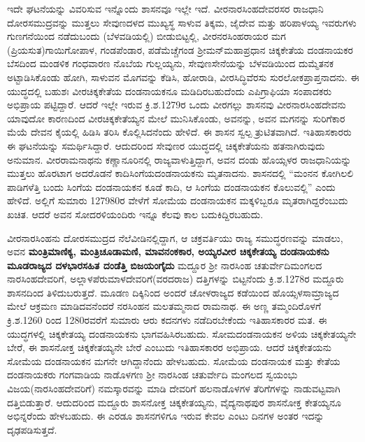ಇದೇ ಘಟನೆಯನ್ನು ವಿವರಿಸುವ ಇನ್ನೊಂದು ಶಾಸನವೂ ಇಲ್ಲೇ ಇದೆ. ವೀರನಾರಸಿಂಹದೇವರಸರ ರಾಜಧಾನಿ ದೋರಸಮುದ್ರವನ್ನು ಮುತ್ತಲು ಸೇವುಣದಳದ ಮುಖ್ಯಸ್ಥ ಸಾಳುವ ತಿಕ್ಕಮ, ಜೈದೇವ ಮತ್ತು ಹರಿಪಾಳಯ್ಯ ಇವರುಗಳು ಗುಣಗನೆಯಿಂದ ನಡೆದುಬಂದು (ಬೆಳವಡಿಯಲ್ಲಿ) ಬೀಡುಬಿಟ್ಟಲ್ಲಿ, ವೀರನರಸಿಂಹರಾಯರ ಮಗ (ಪ್ರಿಯಸುತ)\break ಗಾಯಿಗೋಪಾಳ, ಗಂಡಪೆಂಡಾರ, ಪಡೆಮೆಚ್ಚೆಗಂಡ ಶ‍್ರೀಮನ್​ಮಹಾಪ್ರಧಾನ ಚಿಕ್ಕಕೇತೆಯ ದಂಡನಾಯಕರ ಬೆಸದಿಂದ ಮಂಡಳಿಕ ಗಂಧವಾರಣ ನೊಬೆಯ ಗುಲ್ಲಯ್ಯನು, ಸೇವುಣಸೇನೆಯನ್ನು ಬೆಳವಡಿಯಿಂದ ದುಮ್ಮೆತನಕ ಅಟ್ಟಾಡಿಸಿಕೊಂಡು ಹೋಗಿ, ಸಾಳುವನ ಮೊಗವನ್ನು ಕೆಡಿಸಿ, ಹೋರಾಡಿ, ವೀರಸಿದ್ಧಿವೆರಸು ಸುರಲೋಕಪ್ರಾಪ್ತನಾದನು. ಈ ಯುದ್ಧದಲ್ಲಿ ಬಹುಶಃ ವೀರಚಿಕ್ಕಕೇತೆಯ ದಂಡನಾಯಕನೂ ಮಡಿದಿರಬಹುದೆಂದು ಎಪಿಗ್ರಾಫಿಯಾ ಸಂಪಾದಕರು ಅಭಿಪ್ರಾಯ ಪಟ್ಟಿದ್ದಾರೆ. ಆದರೆ ಇಲ್ಲೇ ಇರುವ ಕ್ರಿ.ಶ.1279ರ ಒಂದು ವೀರಗಲ್ಲು ಶಾಸನವು ವೀರನಾರಸಿಂಹದೇವನು ಯಾವುದೋ ಕಾರಣದಿಂದ ವೀರಚಿಕ್ಕಕೇತೆಯ್ಯನ ಮೇಲೆ ಮುನಿಸಿಕೊಂಡು, ಅವನನ್ನು, ಅವನ ಮಗನನ್ನು ಸುರಿಗೆಕಾರ ಮೆಯೆ ದೇವನ ಕೈಯಲ್ಲಿ ಹಿಡಿಸಿ ತರಿಸಿ ಕೊಲ್ಲಿಸಿದನೆಂದು ಹೇಳಿದೆ. ಈ ಶಾಸನ ಸ್ವಲ್ಪ ತ್ರುಟಿತವಾಗಿದೆ. ಇತಿಹಾಸಕಾರರು ಈ ಘಟನೆಯನ್ನು ಸಮರ್ಥಿಸಿದ್ದಾರೆ. ಆದುದರಿಂದ ಸೇವುಣರ ಯುದ್ಧದಲ್ಲಿ ಚಿಕ್ಕಕೇತೆಯನು ಹತನಾಗಿರುವುದು ಅನುಮಾನ. ವೀರರಾಮನಾಥನು ಕಣ್ಣಾನೂರಿನಲ್ಲಿ ರಾಜ್ಯವಾಳುತ್ತಿದ್ದಾಗ, ಅವನ ದಂಡು ಹೊಯ್ಸಳರ ರಾಜಧಾನಿಯನ್ನು ಮುತ್ತಲು ಹೊರಟಾಗ ಅದರೊಡನೆ ಕಾದಿ\break ಸಿಂಗೆಯದಂಡನಾಯಕನು ಮೃತನಾದನು. ಶಾಸನದಲ್ಲಿ “ಮಂನನ ಕೋಗಿಲಲಿ ಪಾಡಿಗಳೆತ್ತಿ ಬಂದು ಸಿಂಗೆಯ ದಂಡನಾಯಕನ ಕೂಡೆ ಕಾದಿ, ಆ ಸಿಂಗೆಯ ದಂಡನಾಯಕನ ಕೊಲುವಲ್ಲಿ” ಎಂದು ಹೇಳಿದೆ. ಅಲ್ಲಿಗೆ ಸುಮಾರು 1279\enginline{-}80ರ ವೇಳೆಗೆ ಸೋಮೆಯ ದಂಡನಾಯಕನ ಮಕ್ಕಳಿಬ್ಬರೂ ಮೃತರಾಗಿದ್ದರೆಂಬುದು ಖಚಿತ. ಆದರೆ ಅವನ ಸೋದರಳಿಯಂದಿರು ಇನ್ನೂ ಕೆಲವು ಕಾಲ ಬದುಕಿದ್ದಿರಬಹುದು.

ವೀರನಾರಸಿಂಹನು ದೋರಸಮುದ್ರದ ನೆಲೆವೀಡಿನಲ್ಲಿದ್ದಾಗ, ಆ ಚಕ್ರವರ್ತಿಯು ರಾಜ್ಯ ಸಮುದ್ಧರಣವನ್ನು ಮಾಡಲು, ಅವನ \textbf{ಮಂತ್ರಿಮಾಣಿಕ್ಯ, ಮಂತ್ರಿಚೂಡಾಮಣಿ, ಮಾವನಂಕಕಾರ, ಅಯ್ಯರವೀರ ಚಿಕ್ಕಕೇತಯ್ಯ ದಂಡನಾಯಕನು ಮೂಡರಾಜ್ಯದ ದಳಭಾರಸಹಿತ ದಂಡೆತ್ತಿ ಬಿಜಯಂಗೈದು} ಮದ್ದೂರ ಶ‍್ರೀ ನಾರಸಿಂಹ ಚತುರ್ವೇದಿಮಂಗಲದ ನಾರಸಿಂಹ\-ದೇವರಿಗೆ, ಅಲ್ಲಾಳಪೆರುಮಾಳದೇವರಿಗೆ(ವರದರಾಜ) ದತ್ತಿಗಳನ್ನು ಬಿಟ್ಟನೆಂದು ಕ್ರಿ.ಶ.1278ರ ಮದ್ದೂರು ಶಾಸನದಿಂದ ತಿಳಿದುಬರುತ್ತದೆ. ಮೂಡಣ ದಿಕ್ಕಿನಿಂದ ಅಂದರೆ ಚೋಳರಾಜ್ಯದ ಕಡೆಯಿಂದ ಹೊಯ್ಸಳಸಾಮ್ರಾಜ್ಯದ ಮೇಲೆ ಆಕ್ರಮಣ ಮಾಡಿದವನೆಂದರೆ ನರಸಿಂಹನ ಮಲತಮ್ಮನಾದ ರಾಮನಾಥ. ಈ ಅಣ್ಣ ತಮ್ಮಂದಿರೊಳಗೆ ಕ್ರಿ.ಶ.1260 ರಿಂದ 1280ರವರೆಗೆ ಸುಮಾರು ಆರು ಕದನಗಳು ನಡೆದಿರಬೇಕೆಂದು ಇತಿಹಾಸಕಾರರ ಮತ. ಈ ಯುದ್ಧಗಳಲ್ಲಿ ಚಿಕ್ಕಕೇತಯ್ಯ ದಂಡನಾಯಕನು ಭಾಗವಹಿಸಿರಬಹುದು. ಸೋಮದಂಡನಾಯಕನ ಅಳಿಯ ಚಿಕ್ಕಕೇತಯ್ಯನೇ ಬೇರೆ, ಈ ಶಾಸನೋಕ್ತ ಚಿಕ್ಕಕೇತಯ್ಯನೇ ಬೇರೆ ಎಂಬುದು ಇತಿಹಾಸಕಾರರ ಅಭಿಪ್ರಾಯ. ಆದರೆ ಚಿಕ್ಕಕೇತಯನು ಸೋಮೆಯ ದಂಡನಾಯಕನ ಮಗನೇ ಆಗಿದ್ದಾನೆಂದು ಹೇಳಬಹುದು. ಸೋಮೆಯ ದಂಡನಾಯಕ ಮತ್ತು ಕೇತೆಯ ದಂಡನಾಯಕರು ಗಂಗವಾಡಿಯ ನಾಡೊಳಗಣ ಶ‍್ರೀ ನಾರಸಿಂಹ ಚತುರ್ವೇದಿ ಮಂಗಲದ ಸ್ವಯಂಭು ವಿಜಯ(ನಾರಸಿಂಹದೇವರಿಗೆ) ನಮಸ್ಕಾರವನ್ನು ಮಾಡಿ ದೇವರಿಗೆ ಹಲನಾಡೊಳಗಳ ತೆರಿಗೆಗಳನ್ನು ನಾಡುವಟ್ಟವಾಗಿ ದತ್ತಿಬಿಡುತ್ತಾರೆ. ಆದುದರಿಂದ ಮದ್ದೂರು ಶಾಸನೋಕ್ತ ಚಿಕ್ಕಕೇತಯ್ಯನು, ವೈದ್ಯನಾಥಪುರ ಶಾಸನೋಕ್ತ ಕೇತಯ್ಯನೂ ಅಭಿನ್ನರೆಂದು ಹೇಳಬಹುದು. ಈ ಎರಡೂ ಶಾಸನಗಳಿಗೂ ಇರುವ ಕೇವಲ ಎಂಟು ದಿನಗಳ ಅಂತರ ಇದನ್ನು ದೃಢಪಡಿಸುತ್ತದೆ.

